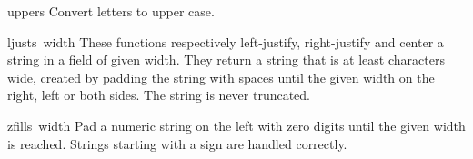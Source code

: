 \begin{funcdesc}{upper}{s}
Convert letters to upper case.
\end{funcdesc}

\begin{funcdesc}{ljust}{s\, width}
These functions respectively left-justify, right-justify and center a
string in a field of given width.
They return a string that is at least
characters wide, created by padding the string
with spaces until the given width on the right, left or both sides.
The string is never truncated.
\end{funcdesc}

\begin{funcdesc}{zfill}{s\, width}
Pad a numeric string on the left with zero digits until the given
width is reached.  Strings starting with a sign are handled correctly.
\end{funcdesc}
